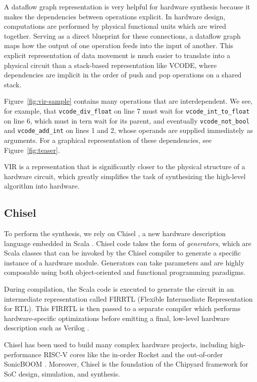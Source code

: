 \documentclass[sigconf, nonacm]{acmart}
\begin{document}
A dataflow graph representation is very helpful for hardware synthesis because it makes the dependencies between operations explicit.
In hardware design, computations are performed by physical functional units which are wired together.
Serving as a direct blueprint for these connections, a dataflow graph maps how the output of one operation feeds into the input of another.
This explicit representation of data movement is much easier to translate into a physical circuit than a stack-based representation like VCODE, where dependencies are implicit in the order of push and pop operations on a shared stack.

Figure~\ref{fig:vir-sample} contains many operations that are interdependent.
We see, for example, that \texttt{vcode\_div\_float} on line 7 must wait for \texttt{vcode\_int\_to\_float} on line 6, which must in tern wait for its parent, and eventually \texttt{vcode\_not\_bool} and \texttt{vcode\_add\_int} on lines 1 and 2, whose operands are supplied immediately as arguments.
For a graphical representation of these dependencies, see Figure~\ref{fig:teaser}.

VIR is a representation that is significantly closer to the physical structure of a hardware circuit, which greatly simplifies the task of synthesizing the high-level algorithm into hardware.

\subsection{Chisel}
\label{sec:chisel}

To perform the synthesis, we rely on Chisel \cite{chisel}, a new hardware description language embedded in Scala \cite{scala-overview}.
Chisel code takes the form of \emph{generators}, which are Scala classes that can be invoked by the Chisel compiler to generate a specific instance of a hardware module.
Generators can take parameters and are highly composable using both object-oriented and functional programming paradigms.

During compilation, the Scala code is executed to generate the circuit in an intermediate representation called FIRRTL (Flexible Intermediate Representation for RTL).
This FIRRTL is then passed to a separate compiler which performs hardware-specific optimizations before emitting a final, low-level hardware description such as Verilog \cite{systemverilog-ieee}.

Chisel has been used to build many complex hardware projects, including high-performance RISC-V cores like the in-order Rocket \cite{rocket-core} and the out-of-order SonicBOOM \cite{boom-core}.
Moreover, Chisel is the foundation of the Chipyard \cite{chipyard} framework for SoC design, simulation, and synthesis.
\end{document}
